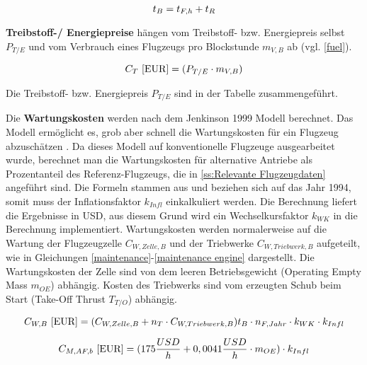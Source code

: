 \begin{equation}
   t_{B} = t_{F,h} + t_{R} \\
   \label{blockzeit}
\end{equation}

\textbf{Treibstoff-/ Energiepreise} hängen vom Treibstoff- bzw. Energiepreis selbst $P_{T/E}$ und vom Verbrauch 
eines Flugzeugs pro Blockstunde $m_{V,B}$ ab (vgl. \eqref{fuel}).

\begin{equation}
   {C_T ~[\text{EUR}]} = (P_{T/E} \cdot m_{V,B}) \\
   \label{fuel}
\end{equation}

Die Treibstoff- bzw. Energiepreis $P_{T/E}$ sind in der Tabelle zusammengeführt.

Die \textbf{Wartungskosten} werden nach dem Jenkinson 1999 Modell berechnet. Das Modell ermöglicht es, grob aber schnell die Wartungskosten 
für ein Flugzeug abzuschätzen \cite{bruge2018wartungskosten}.
Da dieses Modell auf konventionelle Flugzeuge ausgearbeitet wurde, berechnet man die Wartungskosten für alternative Antriebe
als Prozentanteil des Referenz-Flugzeugs, die in \ref{ss:Relevante Flugzeugdaten} angeführt sind.
Die Formeln stammen aus \cite{bruge2018wartungskosten} und beziehen sich auf das Jahr 1994, somit muss der Inflationsfaktor $k_{Infl}$
einkalkuliert werden. Die Berechnung liefert die Ergebnisse in USD, aus diesem Grund wird ein Wechselkursfaktor $k_{WK}$ in die Berechnung implementiert.
Wartungskosten werden normalerweise auf die Wartung der Flugzeugzelle $C_{W,Zelle,B}$ und der Triebwerke 
$C_{W,Triebwerk,B}$ aufgeteilt, wie in Gleichungen \eqref{maintenance}-\eqref{maintenance engine} dargestellt. Die Wartungskosten der Zelle sind von dem leeren Betriebsgewicht 
(Operating Empty Mass $m_{OE}$) abhängig. Kosten des Triebwerks sind vom erzeugten Schub beim Start (Take-Off Thrust $T_{T/O}$) abhängig.

\begin{equation}
   {C_{W,B} ~[\text{EUR}]} = (C_{W,Zelle,B} + n_{T} \cdot C_{W,Triebwerk,B} ) t_{B} \cdot n_{F, Jahr} \cdot k_{WK} \cdot k_{Infl}\\
   \label{maintenance}
\end{equation}

\begin{equation}
   {C_{M,AF,b} ~[\text{EUR}]} = (175 \frac{USD}{h} + 0,0041 \frac{USD}{h} \cdot m_{OE} )\cdot k_{Infl}\\
   \label{maintenance Zelle}
\end{equation}

